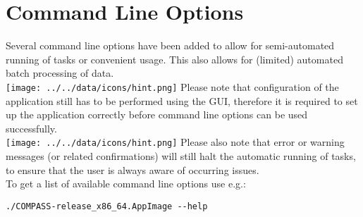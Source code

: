 \section{Command Line Options}
\label{sec:command_line} 

Several command line options have been added to allow for semi-automated running of tasks or convenient usage. This also allows for (limited) automated batch processing of data. \\

\texttt{[image: ../../data/icons/hint.png]} Please note that configuration of the application still has to be performed using the GUI, therefore it is required to set up the application correctly before command line options can be used successfully.\\

\texttt{[image: ../../data/icons/hint.png]} Please also note that error or warning messages (or related confirmations) will still halt the automatic running of tasks, to ensure that the user is always aware of occurring issues. \\

To get a list of available command line options use e.g.:
\begin{lstlisting}
./COMPASS-release_x86_64.AppImage --help
\end{lstlisting}

